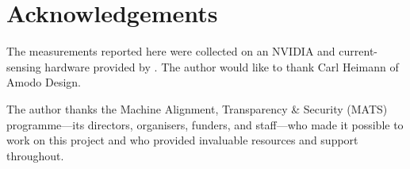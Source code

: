 \documentclass{article}
\begin{document}
\section*{Acknowledgements}
The measurements reported here were collected on an NVIDIA \GPU{} and current-sensing
hardware provided by \citet{amodo2026}. The author would like to thank
Carl Heimann of Amodo Design.

The author thanks the Machine Alignment, Transparency \& Security (MATS) programme---its
directors, organisers, funders, and staff---who made it possible to
work on this project and who provided invaluable resources and support
throughout.




\appendix
{}
\setcounter{table}{0}
\renewcommand{\thetable}{A\arabic{table}}
\renewcommand{\theHtable}{A\arabic{table}}
\setcounter{figure}{0}
\renewcommand{\thefigure}{A\arabic{figure}}
\renewcommand{\theHfigure}{A\arabic{figure}}
\onecolumn

\FloatBarrier
\end{document}

